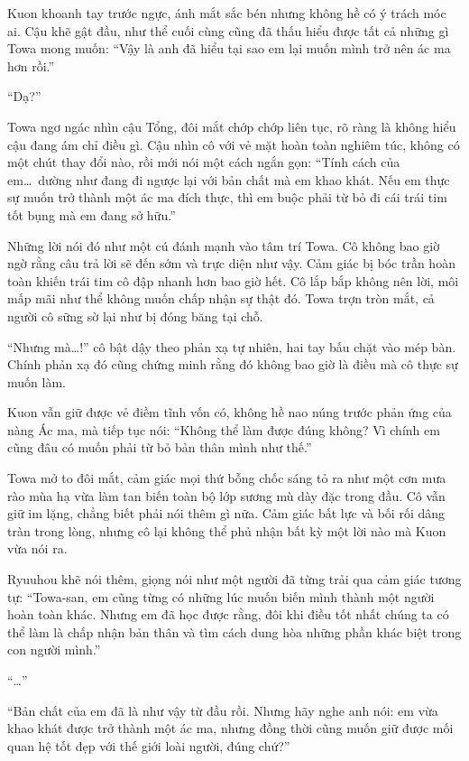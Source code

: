 \documentclass[../main.tex]{subfiles}
\begin{document}
Kuon khoanh tay trước ngực, ánh mắt sắc bén nhưng không hề có ý trách móc ai. Cậu khẽ gật đầu, như thể cuối cùng cũng đã thấu hiểu được tất cả những gì Towa mong muốn: ``Vậy là anh đã hiểu tại sao em lại muốn mình trở nên ác ma hơn rồi.''

``Dạ?''

Towa ngơ ngác nhìn cậu Tổng, đôi mắt chớp chớp liên tục, rõ ràng là không hiểu cậu đang ám chỉ điều gì. Cậu nhìn cô với vẻ mặt hoàn toàn nghiêm túc, không có một chút thay đổi nào, rồi mới nói một cách ngắn gọn: ``Tính cách của em\dots\ dường như đang đi ngược lại với bản chất mà em khao khát. Nếu em thực sự muốn trở thành một ác ma đích thực, thì em buộc phải từ bỏ đi cái trái tim tốt bụng mà em đang sở hữu.''

Những lời nói đó như một cú đánh mạnh vào tâm trí Towa. Cô không bao giờ ngờ rằng câu trả lời sẽ đến sớm và trực diện như vậy. Cảm giác bị bóc trần hoàn toàn khiến trái tim cô đập nhanh hơn bao giờ hết. Cô lắp bắp không nên lời, môi mấp mãi như thể không muốn chấp nhận sự thật đó. Towa trợn tròn mắt, cả người cô sững sờ lại như bị đóng băng tại chỗ.

``Nhưng mà\dots!'' cô bật dậy theo phản xạ tự nhiên, hai tay bấu chặt vào mép bàn. Chính phản xạ đó cũng chứng minh rằng đó không bao giờ là điều mà cô thực sự muốn làm.

Kuon vẫn giữ được vẻ điềm tĩnh vốn có, không hề nao núng trước phản ứng của nàng Ác ma, mà tiếp tục nói: ``Không thể làm được đúng không? Vì chính em cũng đâu có muốn phải từ bỏ bản thân mình như thế.''

Towa mở to đôi mắt, cảm giác mọi thứ bỗng chốc sáng tỏ ra như một cơn mưa rào mùa hạ vừa làm tan biến toàn bộ lớp sương mù dày đặc trong đầu. Cô vẫn giữ im lặng, chẳng biết phải nói thêm gì nữa. Cảm giác bất lực và bối rối dâng tràn trong lòng, nhưng cô lại không thể phủ nhận bất kỳ một lời nào mà Kuon vừa nói ra.

Ryuuhou khẽ nói thêm, giọng nói như một người đã từng trải qua cảm giác tương tự: ``Towa-san, em cũng từng có những lúc muốn biến mình thành một người hoàn toàn khác. Nhưng em đã học được rằng, đôi khi điều tốt nhất chúng ta có thể làm là chấp nhận bản thân và tìm cách dung hòa những phần khác biệt trong con người mình.''

``\dots''

``Bản chất của em đã là như vậy từ đầu rồi. Nhưng hãy nghe anh nói: em vừa khao khát được trở thành một ác ma, nhưng đồng thời cũng muốn giữ được mối quan hệ tốt đẹp với thế giới loài người, đúng chứ?''
\end{document}
